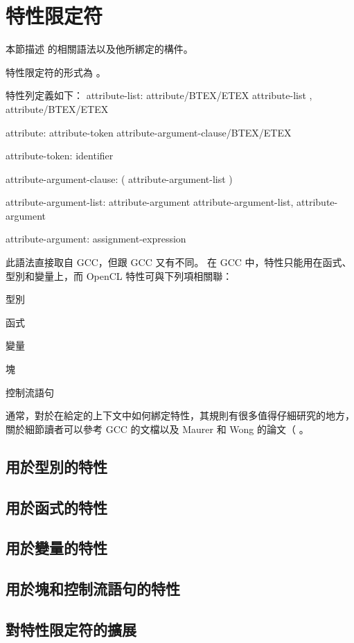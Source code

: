 \section{特性限定符}

本節描述  的相關語法以及他所綁定的構件。

特性限定符的形式為 。

特性列定義如下：
\startclc
attribute-list:
	attribute/BTEX/ETEX
	attribute-list , attribute/BTEX/ETEX

attribute:
	attribute-token attribute-argument-clause/BTEX/ETEX

attribute-token:
	identifier

attribute-argument-clause:
	( attribute-argument-list )

attribute-argument-list:
	attribute-argument
	attribute-argument-list, attribute-argument

attribute-argument:
	assignment-expression
\stopclc

此語法直接取自 GCC，但跟 GCC 又有不同。
在 GCC 中，特性只能用在函式、型別和變量上，而 OpenCL 特性可與下列項相關聯：
\startigBase
\item 型別
\item 函式
\item 變量
\item 塊
\item 控制流語句
\stopigBase

通常，對於在給定的上下文中如何綁定特性，其規則有很多值得仔細研究的地方，
關於細節讀者可以參考 GCC 的文檔以及 Maurer 和 Wong 的論文（
。

\subsection{用於型別的特性}

\subsection{用於函式的特性}

\subsection{用於變量的特性}

\subsection{用於塊和控制流語句的特性}

\subsection{對特性限定符的擴展}

